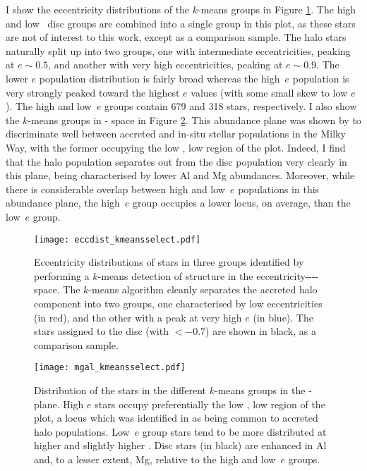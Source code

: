 I show the eccentricity distributions of the $k$-means groups in
Figure \ref{fig:eccdist}. The high and low~\afe{} disc groups are
combined into a single group in this plot, as these stars
are not of interest to this work, except as a comparison sample.
The halo stars naturally split up into two groups, one
with intermediate eccentricities, peaking at $e \sim 0.5$, and
another with very high eccentricities, peaking at $e \sim
0.9$. The lower $e$ population distribution is fairly broad whereas
the high~$e$ population is very strongly peaked toward the highest
$e$ values (with some small skew to low $e$). The high and low~$e$
groups contain 679 and 318 stars, respectively. I also show the
$k$-means groups in \alfe{}-\mgfe{} space in Figure \ref{fig:mgal}.
This abundance plane was shown by \citet{2015MNRAS.453..758H} to
discriminate well between accreted and in-situ stellar populations
in the Milky Way, with the former occupying the low \alfe{}, low
\mgfe{} region of the plot.  Indeed, I find that the halo population
separates out from the disc population very clearly in this plane,
being characterised by lower Al and Mg abundances.  Moreover, while
there is considerable overlap between high and low~$e$ populations
in this abundance plane, the high~$e$ group occupies a lower \mgfe{}
locus, on average, than the low~$e$ group. 


\begin{figure}
\texttt{[image: eccdist\_kmeansselect.pdf]}
\caption[Eccentricity distributions of stars in the $k$-means groups identified in Section \ref{highe}]{\label{fig:eccdist} Eccentricity distributions of stars
in three groups identified by performing a $k$-means detection of
structure in the eccentricity-\feh{}-\mgfe{}-\alfe{}-\nife{} space.
The $k$-means algorithm cleanly separates the accreted halo component
into two groups, one characterised by low eccentricities (in red),
and the other with a peak at very high $e$ (in blue).  The
stars assigned to the disc (with \feh{} $< -0.7$) are shown in black, as a
comparison sample. }
\end{figure}


\begin{figure}
\texttt{[image: mgal\_kmeansselect.pdf]}
\caption[The \mgfe{}-\alfe{} distribution of the $k$-means groups identified in Section \ref{highe}]{\label{fig:mgal}  Distribution of the stars in the different
$k$-means groups in the \mgfe{}-\alfe{} plane.  High $e$ stars
occupy preferentially the low \alfe{}, low \mgfe{} region of the plot, a locus which was identified
in \citet{2015MNRAS.453..758H} as being common to accreted halo populations. Low~$e$ group stars
tend to be more distributed at higher \mgfe{} and slightly higher
\alfe{}. Disc stars (in black) are enhanced in Al and, to a lesser
extent, Mg, relative to the high and low~$e$ groups.}
\end{figure}



